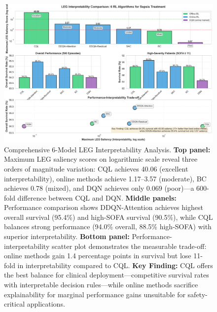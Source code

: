 \begin{figure}[htbp]
\centering
\includegraphics[width=\textwidth]{../results/figures/leg_6model_comparison.png}
\caption{Comprehensive 6-Model LEG Interpretability Analysis. \textbf{Top panel:} Maximum LEG saliency scores on logarithmic scale reveal three orders of magnitude variation: CQL achieves 40.06 (excellent interpretability), online methods achieve 1.17--3.57 (moderate), BC achieves 0.78 (mixed), and DQN achieves only 0.069 (poor)—a 600-fold difference between CQL and DQN. \textbf{Middle panels:} Performance comparison shows DDQN-Attention achieves highest overall survival (95.4\%) and high-SOFA survival (90.5\%), while CQL balances strong performance (94.0\% overall, 88.5\% high-SOFA) with superior interpretability. \textbf{Bottom panel:} Performance-interpretability scatter plot demonstrates the measurable trade-off: online methods gain 1.4 percentage points in survival but lose 11-fold in interpretability compared to CQL. \textbf{Key Finding:} CQL offers the best balance for clinical deployment---competitive survival rates with interpretable decision rules---while online methods sacrifice explainability for marginal performance gains unsuitable for safety-critical applications.}
\label{fig:leg-6model}
\end{figure}

